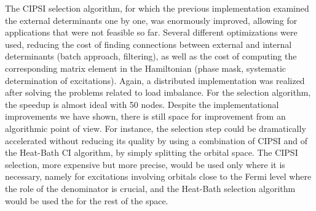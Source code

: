 \documentclass[12pt,a4paper]{report}
\begin{document}

The CIPSI selection algorithm, for which the previous implementation examined the external determinants one by one, was enormously improved, allowing for applications that were not feasible so far.\cite{Scemama_2018,1806.05115} Several different optimizations were used, reducing the cost of finding connections between external and internal determinants (batch approach, filtering), as well as the cost of computing the corresponding matrix element in the Hamiltonian (phase mask, systematic determination of excitations). Again, a distributed implementation was realized after 
solving the problems related to load imbalance. For the selection algorithm, the speedup is almost ideal with 50 nodes. Despite the implementational improvements we have shown, there is still space for improvement from an algorithmic point of view. For instance, the selection step could be dramatically accelerated without reducing its quality by using a combination of CIPSI and of the Heat-Bath CI algorithm\cite{Holmes_2016_2}, by simply splitting the orbital space. The CIPSI selection, more expensive but more precise, would be used only where it is necessary, namely for excitations involving orbitals close to the Fermi level where the role of the denominator is crucial, and the Heat-Bath selection algorithm would be used the for the rest of the space.
\end{document}
